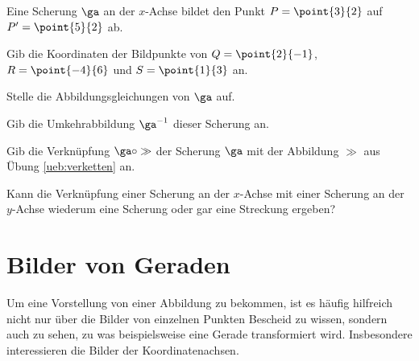 \documentclass[%
11pt,%
twoside,%
titlepage,%
german,%
headsepline%
]{scrartcl}
\begin{document}
\begin{ueb}
Eine Scherung $\ga$ an der $x$-Achse bildet den Punkt $P =\point{3}{2}$ auf $P' =\point{5}{2}$ ab.
\begin{enumeratea}
\item Gib die Koordinaten der Bildpunkte von $Q=\point{2}{-1}$, $R=\point{-4}{6}$ und $S=\point{1}{3}$ an.
\item Stelle die Abbildungsgleichungen von $\ga$ auf.
\item Gib die Umkehrabbildung $\ga^{-1}$ dieser Scherung an.
\item Gib die Verknüpfung $\ga\circ\gg$ der Scherung $\ga$ mit der Abbildung $\gg$ aus \"Ubung \ref{ueb:verketten} an.
\item Kann die Verknüpfung einer Scherung an der $x$-Achse mit einer Scherung an der $y$-Achse wiederum eine Scherung oder gar eine Streckung ergeben?
\end{enumeratea}
\end{ueb}

\section{Bilder von Geraden}
Um
eine Vorstellung von einer Abbildung zu bekommen, ist es häufig hilfreich nicht nur über die Bilder von einzelnen Punkten Bescheid zu wissen, sondern auch zu sehen, zu was beispielsweise eine Gerade transformiert wird. Insbesondere interessieren die Bilder der Koordinatenachsen.
\end{document}
